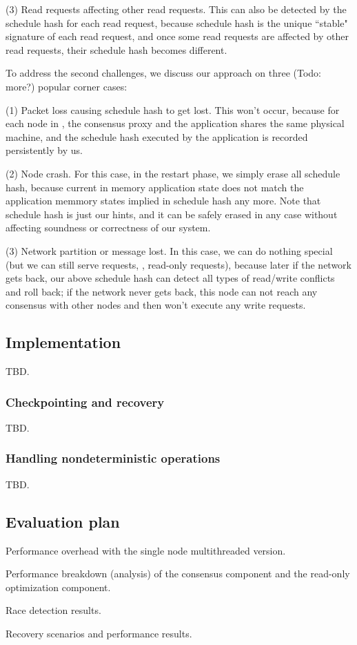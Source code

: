 (3) Read requests affecting other read requests. This can also be detected by 
the schedule hash for each read request, because schedule hash is the unique ``stable" 
signature of each read request, and once some read requests are affected by 
other read requests, their schedule hash becomes different.

To address the second challenges, we discuss our approach on three (Todo: more?) popular 
corner cases:

(1) Packet loss causing schedule hash to get lost. This won't occur, because 
for each node in \msmr, the consensus proxy and the application shares the same 
physical machine, and the schedule hash executed by the application is recorded 
persistently by us.

(2) Node crash. For this case, in the restart phase, we simply erase all 
schedule hash, because current in memory application state does not match the 
application memmory states implied in schedule hash any more. Note that 
schedule hash is just our hints, and it can be safely erased in any case 
without affecting soundness or correctness of our system.

(3) Network partition or \paxos message lost. In this case, we can do nothing 
special (but we can still serve requests, \eg, read-only requests), because 
later if the network gets back, our above schedule hash can detect all types of 
read/write conflicts and roll back; if the network never gets back, this node 
can not reach any consensus with other nodes and then won't execute any write 
requests.


\subsection{Implementation} \label{sec:replication-impl}
TBD.

\subsubsection{Checkpointing and recovery} \label{sec:replication-impl-checkpoint}
TBD.

\subsubsection{Handling nondeterministic operations} \label{sec:replication-impl-nondet}
TBD.

\subsection{Evaluation plan} \label{sec:replication-eval}
Performance overhead with the single node multithreaded version.

Performance breakdown (analysis) of the consensus component and the read-only optimization component.

Race detection results.

Recovery scenarios and performance results.



